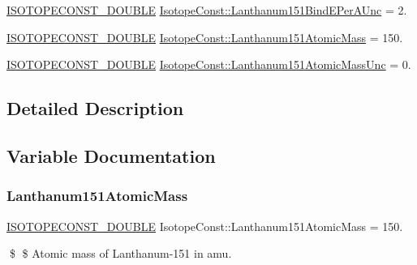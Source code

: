 \begin{DoxyCompactItemize}
\mbox{\hyperlink{group___isotope_const-_macros_ga8f45a7272ce02c0b4c65c44636ed719a}{I\+S\+O\+T\+O\+P\+E\+C\+O\+N\+S\+T\+\_\+\+D\+O\+U\+B\+LE}} \mbox{\hyperlink{group___isotope_const-_lanthanum-_la151_ga275d157c294f3a8d49083d3a0bff02b3}{Isotope\+Const\+::\+Lanthanum151\+Bind\+E\+Per\+A\+Unc}} = 2.
\item 
\mbox{\hyperlink{group___isotope_const-_macros_ga8f45a7272ce02c0b4c65c44636ed719a}{I\+S\+O\+T\+O\+P\+E\+C\+O\+N\+S\+T\+\_\+\+D\+O\+U\+B\+LE}} \mbox{\hyperlink{group___isotope_const-_lanthanum-_la151_ga2a413a15816ca3a7b6682dc9a00f3541}{Isotope\+Const\+::\+Lanthanum151\+Atomic\+Mass}} = 150.
\item 
\mbox{\hyperlink{group___isotope_const-_macros_ga8f45a7272ce02c0b4c65c44636ed719a}{I\+S\+O\+T\+O\+P\+E\+C\+O\+N\+S\+T\+\_\+\+D\+O\+U\+B\+LE}} \mbox{\hyperlink{group___isotope_const-_lanthanum-_la151_gafc0d52a0a371bf07dcfd13ed18ea53d2}{Isotope\+Const\+::\+Lanthanum151\+Atomic\+Mass\+Unc}} = 0.
\end{DoxyCompactItemize}


\subsection{Detailed Description}


\subsection{Variable Documentation}
\mbox{\label{group___isotope_const-_lanthanum-_la151_ga2a413a15816ca3a7b6682dc9a00f3541}} 
\subsubsection{\texorpdfstring{Lanthanum151\+Atomic\+Mass}{Lanthanum151AtomicMass}}
{\footnotesize\ttfamily \mbox{\hyperlink{group___isotope_const-_macros_ga8f45a7272ce02c0b4c65c44636ed719a}{I\+S\+O\+T\+O\+P\+E\+C\+O\+N\+S\+T\+\_\+\+D\+O\+U\+B\+LE}} Isotope\+Const\+::\+Lanthanum151\+Atomic\+Mass = 150.}

\$ \$ Atomic mass of Lanthanum-\/151 in amu. \mbox{\label{group___isotope_const-_lanthanum-_la151_gafc0d52a0a371bf07dcfd13ed18ea53d2}} 
